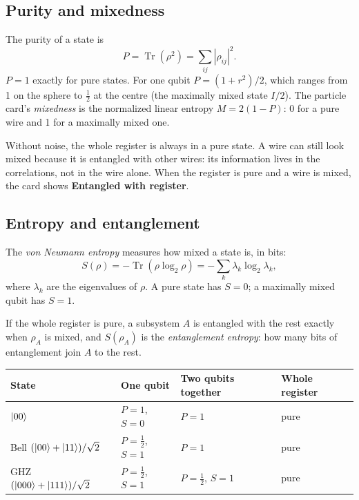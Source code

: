 \subsection{Purity and mixedness}

The purity of a state is
\[
P=\operatorname{Tr}(\rho^2)=\sum_{ij}|\rho_{ij}|^2 .
\]
$P=1$ exactly for pure states. For one qubit $P=(1+r^2)/2$, which ranges from
1 on the sphere to $\tfrac12$ at the centre (the maximally mixed state $I/2$).
The particle card's \emph{mixedness} is the normalized linear entropy
$M=2(1-P)$: 0 for a pure wire and 1 for a maximally mixed one.

\begin{beginnerbox}
Without noise, the whole register is always in a pure state. A wire can still
look mixed because it is entangled with other wires: its information lives in
the correlations, not in the wire alone. When the register is pure and a wire
is mixed, the card shows \textbf{Entangled with register}.
\end{beginnerbox}

\subsection{Entropy and entanglement}

The \emph{von Neumann entropy} measures how mixed a state is, in bits:
\[
S(\rho)=-\operatorname{Tr}(\rho\log_2\rho)=-\sum_k\lambda_k\log_2\lambda_k,
\]
where $\lambda_k$ are the eigenvalues of $\rho$. A pure state has $S=0$; a
maximally mixed qubit has $S=1$.

If the whole register is pure, a subsystem $A$ is entangled with the rest
exactly when $\rho_A$ is mixed, and $S(\rho_A)$ is the \emph{entanglement
entropy}: how many bits of entanglement join $A$ to the rest.

\begin{center}
\begin{tabularx}{\textwidth}{l X X X}
\toprule
State & One qubit & Two qubits together & Whole register\\
\midrule
$\lvert 00\rangle$ & $P=1$, $S=0$ & $P=1$ & pure\\
Bell $(\lvert 00\rangle+\lvert 11\rangle)/\sqrt2$ & $P=\tfrac12$, $S=1$ & $P=1$ & pure\\
GHZ $(\lvert 000\rangle+\lvert 111\rangle)/\sqrt2$ & $P=\tfrac12$, $S=1$ & $P=\tfrac12$, $S=1$ & pure\\
\bottomrule
\end{tabularx}
\end{center}

